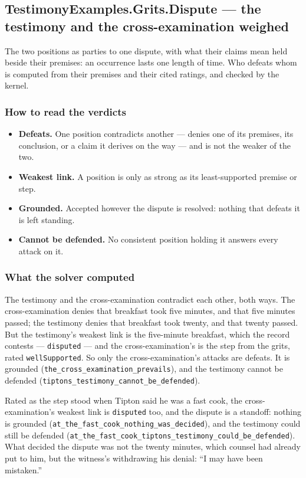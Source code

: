\documentclass[11pt]{article}
\begin{document}
\subsection*{TestimonyExamples.Grits.Dispute — the testimony and the cross-examination weighed}
The two positions as parties to one dispute, with what their claims mean held beside their premises: an occurrence lasts one length of time. Who defeats whom is computed from their premises and their cited ratings, and checked by the kernel.

\subsubsection*{How to read the verdicts}
\begin{itemize}
  \item \textbf{Defeats.} One position contradicts another — denies one of its premises, its conclusion, or a claim it derives on the way — and is not the weaker of the two.
  \item \textbf{Weakest link.} A position is only as strong as its least-supported premise or step.
  \item \textbf{Grounded.} Accepted however the dispute is resolved: nothing that defeats it is left standing.
  \item \textbf{Cannot be defended.} No consistent position holding it answers every attack on it.
\end{itemize}
\subsubsection*{What the solver computed}
The testimony and the cross-examination contradict each other, both ways. The cross-examination denies that breakfast took five minutes, and that five minutes passed; the testimony denies that breakfast took twenty, and that twenty passed. But the testimony’s weakest link is the five-minute breakfast, which the record contests — \texttt{disputed} — and the cross-examination’s is the step from the grits, rated \texttt{well\allowbreak{}Supported}. So only the cross-examination’s attacks are defeats. It is grounded (\texttt{the\_\allowbreak{}cross\_\allowbreak{}examination\_\allowbreak{}prevails}), and the testimony cannot be defended (\texttt{tiptons\_\allowbreak{}testimony\_\allowbreak{}cannot\_\allowbreak{}be\_\allowbreak{}defended}).

Rated as the step stood when Tipton said he was a fast cook, the cross-examination’s weakest link is \texttt{disputed} too, and the dispute is a standoff: nothing is grounded (\texttt{at\_\allowbreak{}the\_\allowbreak{}fast\_\allowbreak{}cook\_\allowbreak{}nothing\_\allowbreak{}was\_\allowbreak{}decided}), and the testimony could still be defended (\texttt{at\_\allowbreak{}the\_\allowbreak{}fast\_\allowbreak{}cook\_\allowbreak{}tiptons\_\allowbreak{}testimony\_\allowbreak{}could\_\allowbreak{}be\_\allowbreak{}defended}). What decided the dispute was not the twenty minutes, which counsel had already put to him, but the witness’s withdrawing his denial: “I may have been mistaken.”
\end{document}
